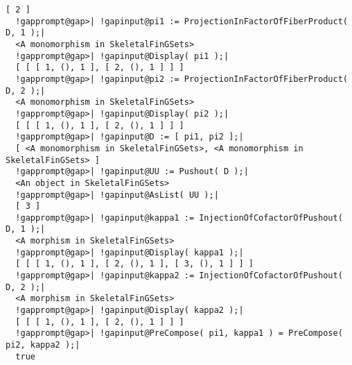 \documentclass[a4paper,11pt]{report}
\begin{document}
{{{\begin{Verbatim}[commandchars=!@|,fontsize=\small,frame=single,label=Example]
  [ 2 ]
  !gapprompt@gap>| !gapinput@pi1 := ProjectionInFactorOfFiberProduct( D, 1 );|
  <A monomorphism in SkeletalFinGSets>
  !gapprompt@gap>| !gapinput@Display( pi1 );|
  [ [ [ 1, (), 1 ], [ 2, (), 1 ] ] ]
  !gapprompt@gap>| !gapinput@pi2 := ProjectionInFactorOfFiberProduct( D, 2 );|
  <A monomorphism in SkeletalFinGSets>
  !gapprompt@gap>| !gapinput@Display( pi2 );|
  [ [ [ 1, (), 1 ], [ 2, (), 1 ] ] ]
  !gapprompt@gap>| !gapinput@D := [ pi1, pi2 ];|
  [ <A monomorphism in SkeletalFinGSets>, <A monomorphism in SkeletalFinGSets> ]
  !gapprompt@gap>| !gapinput@UU := Pushout( D );|
  <An object in SkeletalFinGSets>
  !gapprompt@gap>| !gapinput@AsList( UU );|
  [ 3 ]
  !gapprompt@gap>| !gapinput@kappa1 := InjectionOfCofactorOfPushout( D, 1 );|
  <A morphism in SkeletalFinGSets>
  !gapprompt@gap>| !gapinput@Display( kappa1 );|
  [ [ [ 1, (), 1 ], [ 2, (), 1 ], [ 3, (), 1 ] ] ]
  !gapprompt@gap>| !gapinput@kappa2 := InjectionOfCofactorOfPushout( D, 2 );|
  <A morphism in SkeletalFinGSets>
  !gapprompt@gap>| !gapinput@Display( kappa2 );|
  [ [ [ 1, (), 1 ], [ 2, (), 1 ] ] ]
  !gapprompt@gap>| !gapinput@PreCompose( pi1, kappa1 ) = PreCompose( pi2, kappa2 );|
  true
\end{Verbatim}
 

 }

 }

 }

   
\end{document}
